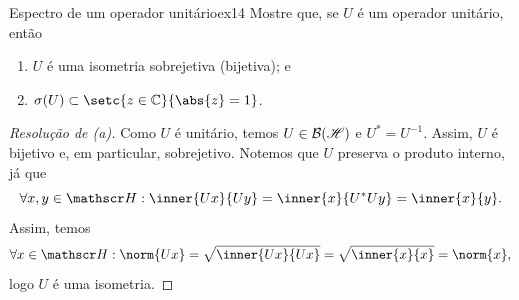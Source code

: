 \begin{exercício}{Espectro de um operador unitário}{ex14}
    Mostre que, se \(U\) é um operador unitário, então
    \begin{enumerate}[label=(\alph*)]
        \item \(U\) é uma isometria sobrejetiva (bijetiva); e
        \item \(\sigma(U) \subset \setc{z \in \mathbb{C}}{\abs{z} = 1}\).
    \end{enumerate}
\end{exercício}
\begin{proof}[Resolução de (a)]
  Como \(U\) é unitário, temos \(U \in \mathcal{B}(\mathscr{H})\) e \(U^* = U^{-1}.\) Assim, \(U\) é bijetivo e, em particular, sobrejetivo. Notemos que \(U\) preserva o produto interno, já que
  \begin{equation*}
    \forall x,y \in \hilbert: \inner{Ux}{Uy} = \inner{x}{U^*Uy} = \inner{x}{y}.
  \end{equation*}
  Assim, temos
  \begin{equation*}
    \forall x \in \hilbert: \norm{Ux} = \sqrt{\inner{Ux}{Ux}} = \sqrt{\inner{x}{x}} = \norm{x},
  \end{equation*}
  logo \(U\) é uma isometria.
\end{proof}
